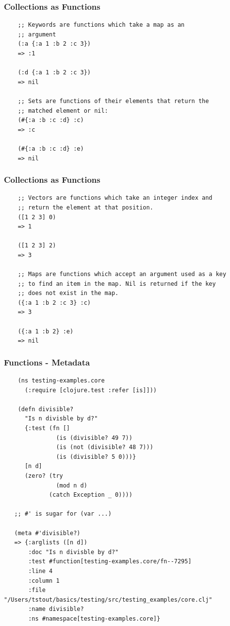 \documentclass{beamer}
\renewcommand{\footnotesize}{\tiny}
\begin{document}
\begin{frame}[fragile]
  \frametitle{Collections as Functions}
  \begin{verbatim}
    ;; Keywords are functions which take a map as an
    ;; argument
    (:a {:a 1 :b 2 :c 3})
    => :1

    (:d {:a 1 :b 2 :c 3})
    => nil

    ;; Sets are functions of their elements that return the 
    ;; matched element or nil: 
    (#{:a :b :c :d} :c)
    => :c

    (#{:a :b :c :d} :e)
    => nil

  \end{verbatim}
\end{frame}

\begin{frame}[fragile]
  \frametitle{Collections as Functions}
  \begin{verbatim}
    ;; Vectors are functions which take an integer index and 
    ;; return the element at that position.
    ([1 2 3] 0)
    => 1

    ([1 2 3] 2)
    => 3

    ;; Maps are functions which accept an argument used as a key 
    ;; to find an item in the map. Nil is returned if the key
    ;; does not exist in the map.
    ({:a 1 :b 2 :c 3} :c)
    => 3

    ({:a 1 :b 2} :e)
    => nil

  \end{verbatim}
\end{frame}

\begin{frame}[fragile]
  \frametitle{Functions - Metadata}
  \begin{verbatim}
    (ns testing-examples.core
      (:require [clojure.test :refer [is]]))

    (defn divisible?
      "Is n divisble by d?"
      {:test (fn []
               (is (divisible? 49 7))
               (is (not (divisible? 48 7)))
               (is (divisible? 5 0)))}
      [n d]
      (zero? (try 
               (mod n d)
             (catch Exception _ 0))))
      
   ;; #' is sugar for (var ...)

   (meta #'divisible?)  
   => {:arglists ([n d])
       :doc "Is n divisble by d?"
       :test #function[testing-examples.core/fn--7295]
       :line 4
       :column 1
       :file "/Users/tstout/basics/testing/src/testing_examples/core.clj"
       :name divisible?
       :ns #namespace[testing-examples.core]}
  \end{verbatim}
\end{frame}
\end{document}
